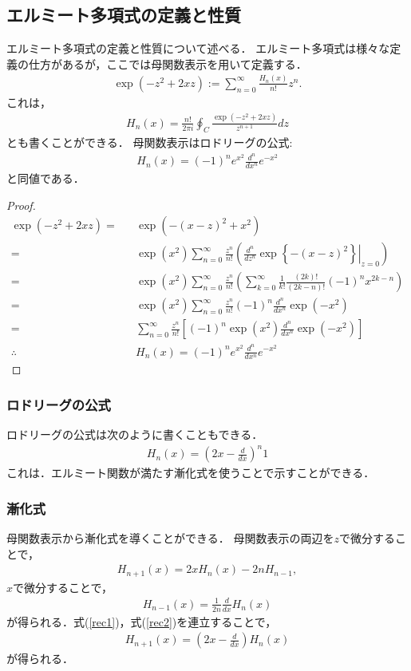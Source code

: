 \documentclass[12pt]{jsarticle}
\numberwithin{equation}{section}
\begin{document}
\subsection{エルミート多項式の定義と性質}
エルミート多項式の定義と性質について述べる．
エルミート多項式は様々な定義の仕方があるが，ここでは母関数表示を用いて定義する．
\begin{eqnarray}
	\exp(-z^2+2xz) := \sum_{n=0}^{\infty} \frac{H_n(x)}{n!} z^n.
\end{eqnarray}
これは，
\begin{eqnarray}
	H_n(x) = \frac{n!}{2\pi i}\oint_{C}^{} \frac{\exp(-z^2+2xz)}{z^{n+1}}dz
\end{eqnarray}
とも書くことができる．
母関数表示はロドリーグの公式:
\begin{eqnarray}
	H_n(x) = (-1)^ne^{x^2} \frac{d^n}{dx^n}e^{-x^2}
\end{eqnarray}
と同値である．
\begin{proof}
\begin{eqnarray}
 	\exp(-z^2+2xz) =&& \exp(-(x-z)^2 + x^2) \nonumber\\
	=&& \exp(x^2) \sum_{n=0}^{\infty} \frac{z^n}{n!} \left(\left.\frac{d^n}{dz^n} \exp \left\{-(x-z)^2\right\}\right|_{z=0}\right)\nonumber\\
	=&& \exp(x^2) \sum_{n=0}^{\infty} \frac{z^n}{n!} \left(\sum_{k=0}^{\infty}\frac{1}{k!} \frac{(2k)!}{(2k-n)!}(-1)^n x^{2k-n} \right) \nonumber\\
	=&& \exp(x^2) \sum_{n=0}^{\infty} \frac{z^n}{n!} (-1)^n \frac{d^n}{dx^n} \exp(-x^2) \nonumber\\
	=&& \sum_{n=0}^{\infty} \frac{z^n}{n!} \left[(-1)^n \exp(x^2) \frac{d^n}{dx^n} \exp(-x^2)\right] \nonumber\\
	\therefore&& H_n(x) = (-1)^ne^{x^2} \frac{d^n}{dx^n}e^{-x^2} \nonumber
\end{eqnarray}
\end{proof}
\subsubsection{ロドリーグの公式}
ロドリーグの公式は次のように書くこともできる．
\begin{eqnarray}
	H_{n}(x) = \left(2x-\frac{d}{dx}\right)^n 1
\end{eqnarray}
これは．エルミート関数が満たす漸化式を使うことで示すことができる．

\subsubsection{漸化式}
母関数表示から漸化式を導くことができる．
母関数表示の両辺を$z$で微分することで，
\begin{eqnarray}\label{rec1}
	H_{n+1}(x) = 2xH_n(x) -2nH_{n-1},
\end{eqnarray}
$x$で微分することで，
\begin{eqnarray}\label{rec2}
	H_{n-1}(x) = \frac{1}{2n}\frac{d}{dx}H_n(x)
\end{eqnarray}
が得られる．式(\ref{rec1})，式(\ref{rec2})を連立することで，
\begin{eqnarray}\label{rec3}
	H_{n+1}(x) = \left(2x-\frac{d}{dx}\right)H_n(x)
\end{eqnarray}
が得られる．
\end{document}
